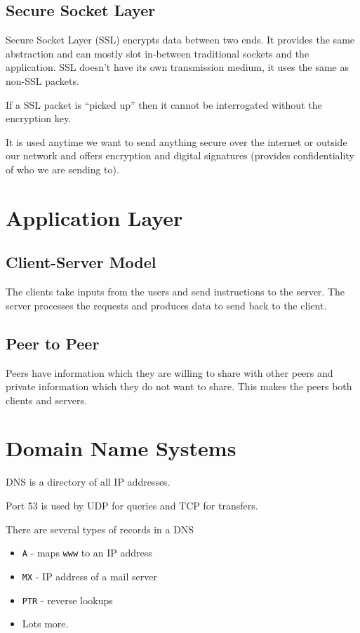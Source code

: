 \subsection{Secure Socket Layer}

Secure Socket Layer (SSL) encrypts data between two ends. It provides the same abstraction and can mostly slot in-between traditional sockets and the application. SSL doesn't have its own transmission medium, it uses the same as non-SSL packets.

If a SSL packet is ``picked up'' then it cannot be interrogated without the encryption key.

It is used anytime we want to send anything secure over the internet or outside our network and offers encryption and digital signatures (provides confidentiality of who we are sending to). 

\section{Application Layer}
\subsection{Client-Server Model}
The clients take inputs from the users and send instructions to the server. The server processes the requests and produces data to send back to the client. 
\subsection{Peer to Peer}
Peers have information which they are willing to share with other peers and private information which they do not want to share. This makes the peers both clients and servers.

\section{Domain Name Systems}
DNS is a directory of all IP addresses.

Port 53 is used by UDP for queries and TCP for transfers.

There are several types of records in a DNS
\begin{itemize}
    \item \verb|A| - maps \verb|www| to an IP address
    \item \verb|MX| - IP address of a mail server
    \item \verb|PTR| - reverse lookups
    \item Lots more.
\end{itemize}